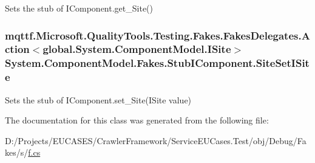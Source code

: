 Sets the stub of I\-Component.\-get\-\_\-\-Site()

\hypertarget{class_system_1_1_component_model_1_1_fakes_1_1_stub_i_component_af27a69329ad64d82e66867583cf403ed}{
\subsubsection[{Site\-Set\-I\-Site}]{\setlength{\rightskip}{0pt plus 5cm}mqttf.\-Microsoft.\-Quality\-Tools.\-Testing.\-Fakes.\-Fakes\-Delegates.\-Action$<$global.\-System.\-Component\-Model.\-I\-Site$>$ System.\-Component\-Model.\-Fakes.\-Stub\-I\-Component.\-Site\-Set\-I\-Site}}\label{class_system_1_1_component_model_1_1_fakes_1_1_stub_i_component_af27a69329ad64d82e66867583cf403ed}


Sets the stub of I\-Component.\-set\-\_\-\-Site(\-I\-Site value)



The documentation for this class was generated from the following file\-:\begin{DoxyCompactItemize}
\item 
D\-:/\-Projects/\-E\-U\-C\-A\-S\-E\-S/\-Crawler\-Framework/\-Service\-E\-U\-Cases.\-Test/obj/\-Debug/\-Fakes/s/\hyperlink{s_2f_8cs}{f.\-cs}\end{DoxyCompactItemize}
